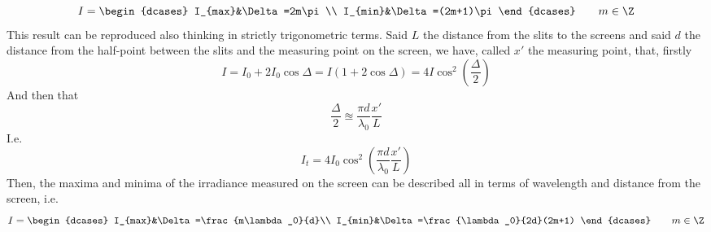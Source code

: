 \documentclass[../electromagnetism.tex]{subfiles}
\begin{document}
\begin{equation}
	I=\begin{dcases}
		I_{max}&\Delta=2m\pi\\
		I_{min}&\Delta=(2m+1)\pi
	\end{dcases}\qquad m\in\Z
	\label{eq:imaximinyoung.yint}
\end{equation}
This result can be reproduced also thinking in strictly trigonometric terms. Said $L$ the distance from the slits to the screens and said $d$ the distance from the half-point between the slits and the measuring point on the screen, we have, called $x'$ the measuring point, that, firstly
\begin{equation*}
	I=I_0+2I_0\cos\Delta=I\left( 1+2\cos\Delta \right)=4I\cos^2\left( \frac{\Delta}{2} \right)
\end{equation*}
And then that
\begin{equation}
	\frac{\Delta}{2}\approxeq\frac{\pi d}{\lambda_0}\frac{x'}{L}
	\label{eq:delta12approx.yint}
\end{equation}
I.e.
\begin{equation*}
	I_t=4I_0\cos^2\left( \frac{\pi d}{\lambda_0}\frac{x'}{L} \right)
\end{equation*}
Then, the maxima and minima of the irradiance measured on the screen can be described all in terms of wavelength and distance from the screen, i.e.
\begin{equation}
	I=\begin{dcases}
		I_{max}&\Delta=\frac{m\lambda_0}{d}\\
		I_{min}&\Delta=\frac{\lambda_0}{2d}(2m+1)
	\end{dcases}\qquad m\in\Z
	\label{eq:itot.yint}
\end{equation}
\end{document}
